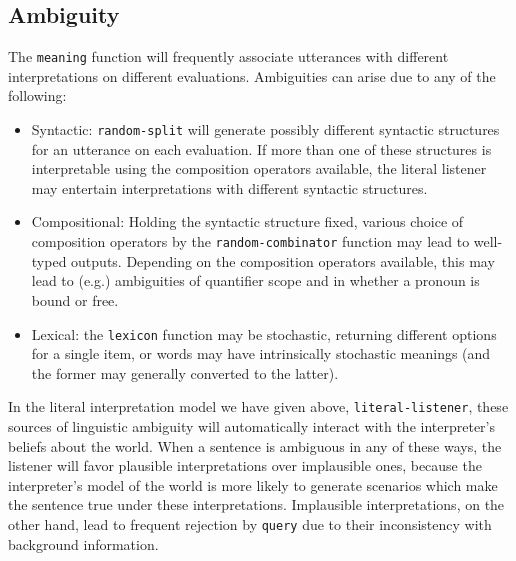 \documentclass[12pt]{article}
\begin{document}
\subsection{\label{ambiguity}Ambiguity}
The \lstinline{meaning} function will frequently associate utterances with different interpretations on different evaluations. 
Ambiguities can arise due to any of the following:
\begin{itemize}
\item Syntactic: \lstinline{random-split} will generate possibly different syntactic structures for an utterance on each evaluation. 
If more than one of these structures is interpretable using the composition operators available, the literal listener may entertain interpretations with different syntactic structures.
\item Compositional: Holding the syntactic structure fixed, various choice of composition operators by the \lstinline{random-combinator} function may lead to well-typed outputs. 
Depending on the composition operators available, this may lead to (e.g.) ambiguities of quantifier scope and in whether a pronoun is bound or free.
\item Lexical: the \lstinline{lexicon} function may be stochastic, returning different options for a single item, or words may have intrinsically stochastic meanings (and the former may generally converted to the latter). 
\end{itemize}
In the literal interpretation model we have given above, \lstinline{literal-listener}, these sources of linguistic ambiguity will automatically interact with the interpreter's beliefs about the world.
 When a sentence is ambiguous in any of these ways, the listener will favor plausible interpretations over implausible ones, because the interpreter's model of the world is more likely to generate scenarios which make the sentence true under these interpretations. 
Implausible interpretations, on the other hand, lead to frequent rejection by \lstinline{query} due to their inconsistency with background information.
\end{document}
